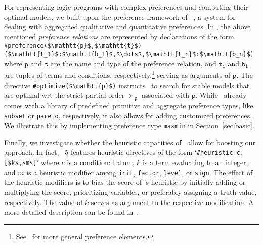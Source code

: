 For representing logic programs with complex preferences and computing their optimal models,
we built upon the preference framework of \asprin~\cite{brderosc15a},
a system for dealing with aggregated qualitative and quantitative preferences.
%
In \asprin, the above mentioned \emph{preference relations} are represented by declarations of the form
\lstinline[mathescape]!#preference($\mathtt{p}$,$\mathtt{t}$){$\mathtt{t_1}$:$\mathtt{b_1}$,$\dots$,$\mathtt{t_n}$:$\mathtt{b_n}$}!
where $\mathtt{p}$ and $\mathtt{t}$ are the name and type of the preference relation, %
and $\mathtt{t_i}$ and $\mathtt{b_i}$ are tuples of terms and conditions, respectively,\footnote{
See~\cite{brderosc15a} %
for more general preference elements.}
serving as arguments of $\mathtt{p}$.
%
The directive \lstinline[mathescape]!#optimize($\mathtt{p}$)! instructs \asprin\ to search for stable models that are optimal wrt the strict partial order
$\succ_{\mathtt{p}}$ associated with $\mathtt{p}$.
%
While \asprin\ already comes with a library of predefined primitive and aggregate preference types, like \texttt{subset} or \texttt{pareto},
respectively,
it also allows for adding customized preferences.
%
We illustrate this by implementing preference type \texttt{maxmin} in Section~\ref{sec:basic}.
%

Finally,
we investigate whether the heuristic capacities of \clingo\ allow for boosting our approach.
%
In fact, \clingo~5 features heuristic directives of the form
`\lstinline[mathescape]!#heuristic c. [$k$,$m$]!'
where $c$ is a conditional atom,
$k$ is a term evaluating to an integer, and 
$m$ is a heuristic modifier among
\lstinline{init}, \lstinline{factor}, \lstinline{level},  or \lstinline{sign}. %
%
The effect of the heuristic modifiers is to bias the score of \clasp's heuristic by
initially adding or multiplying the score,
prioritizing variables, or
preferably assigning a truth value, respectively.
%
The value of $k$ serves as argument to the respective modification.
%
%
A more detailed description can be found in~\cite{gekaotroscwa13a}.

